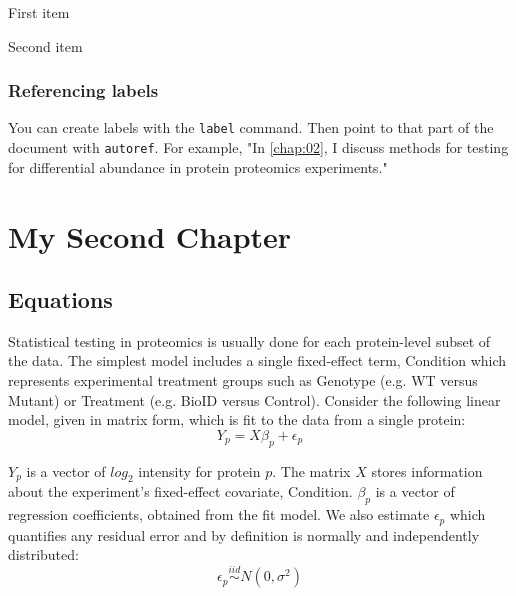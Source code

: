 \documentclass[PhD]{dukethesis}
\begin{document}
\lipsum[2-3]
\begin{compactenum} %
	\item{First item}
	\item{Second item}
\end{compactenum}


\subsection{Referencing labels}

You can create labels with the \texttt{label} command. Then point to that part
of the document with \texttt{autoref}. For example, "In \autoref{chap:02}, I discuss methods
for testing for differential abundance in protein proteomics experiments."



\chapter{My Second Chapter}
\label{chap:02}

\section{Equations}

Statistical testing in proteomics is usually done for each protein-level subset
of the data. The simplest model includes a single fixed-effect term,
Condition which represents experimental treatment groups such as
Genotype (e.g. WT versus Mutant) or Treatment (e.g. BioID versus Control).
Consider the following linear model, given in matrix form, which is fit to the
data from a single protein:
\begin{equation}
	\label{eq:lm}
	Y_{p} = X\beta_{p} + \epsilon_{p} %
\end{equation}

$Y_{p}$ is a vector of $log_{2}$ intensity for protein $p$. The matrix $X$
stores information about the experiment's fixed-effect covariate,
Condition.  $\beta_{p}$ is a vector of regression coefficients,
obtained from the fit model.  We also estimate $\epsilon_{p}$ which quantifies
any residual error and by definition is normally and independently distributed:
\begin{equation}
    \label{eq:error}
	\epsilon_{p} \stackrel{iid}{\sim} N(0,\sigma^2) %
\end{equation}
\end{document}
